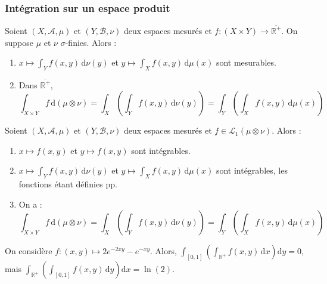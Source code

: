 	\subsubsection{Intégration sur un espace produit}
	
	
	\begin{theorem}
		Soient $(X, \mathcal{A}, \mu)$ et $(Y, \mathcal{B}, \nu)$ deux espaces mesurés et $f : (X \times Y) \rightarrow \overline{\mathbb{R}^+}$. On suppose $\mu$ et $\nu$ $\sigma$-finies. Alors :
		\begin{enumerate}[label=(\roman*)]
			\item $x \mapsto \int_Y f(x,y) \, \mathrm{d}\nu(y)$ et $y \mapsto \int_X f(x,y) \, \mathrm{d}\mu(x)$ sont mesurables.
			\item Dans $\overline{\mathbb{R}^+}$,
			\[ \int_{X \times Y} f \, \mathrm{d}(\mu \otimes \nu) = \int_X \left( \int_Y f(x,y) \, \mathrm{d}\nu(y) \right) = \int_Y \left( \int_X f(x,y) \, \mathrm{d}\mu(x) \right) \]
		\end{enumerate}
	\end{theorem}
	
	\begin{theorem}
		Soient $(X, \mathcal{A}, \mu)$ et $(Y, \mathcal{B}, \nu)$ deux espaces mesurés et $f \in \mathcal{L}_1 (\mu \otimes \nu)$. Alors :
		\begin{enumerate}[label=(\roman*)]
			\item $x \mapsto f(x,y)$ et $y \mapsto f(x,y)$ sont intégrables.
			\item $x \mapsto \int_Y f(x,y) \, \mathrm{d}\nu(y)$ et $y \mapsto \int_X f(x,y) \, \mathrm{d}\mu(x)$ sont intégrables, les fonctions étant définies pp.
			\item On a :
			\[ \int_{X \times Y} f \, \mathrm{d}(\mu \otimes \nu) = \int_X \left( \int_Y f(x,y) \, \mathrm{d}\nu(y) \right) = \int_Y \left( \int_X f(x,y) \, \mathrm{d}\mu(x) \right) \]
		\end{enumerate}
	\end{theorem}
	
	\begin{cexample}
		On considère $f : (x,y) \mapsto 2e^{-2xy} - e^{-xy}$. Alors, $\int_{[0,1]} \left( \int_{\mathbb{R}^+} f(x,y) \, \mathrm{d}x \right) \mathrm{d}y = 0$, mais $\int_{\mathbb{R}^+} \left( \int_{[0,1]} f(x,y) \, \mathrm{d}y \right) \mathrm{d}x = \ln(2)$.
	\end{cexample}
	
